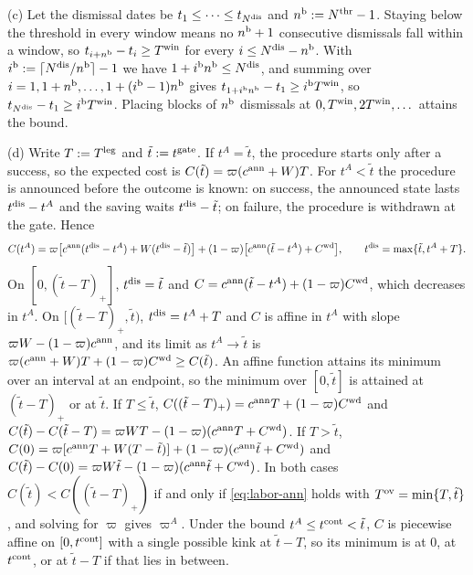 (c) Let the dismissal dates be $t_1\le\dots\le t_{N^{\rm dis}}$ and $n^{\rm b}:=N^{\rm thr}-1$. Staying below the threshold in every window means no $n^{\rm b}+1$ consecutive dismissals fall within a window, so $t_{i+n^{\rm b}}-t_i\ge T^{\rm win}$ for every $i\le N^{\rm dis}-n^{\rm b}$. With $i^{\rm b}:=\lceil N^{\rm dis}/n^{\rm b}\rceil-1$ we have $1+i^{\rm b}n^{\rm b}\le N^{\rm dis}$, and summing over $i=1,1+n^{\rm b},\dots,1+(i^{\rm b}-1)n^{\rm b}$ gives $t_{1+i^{\rm b}n^{\rm b}}-t_1\ge i^{\rm b}T^{\rm win}$, so $t_{N^{\rm dis}}-t_1\ge i^{\rm b}T^{\rm win}$. Placing blocks of $n^{\rm b}$ dismissals at $0,T^{\rm win},2T^{\rm win},\dots$ attains the bound.

(d) Write $T:=T^{\rm leg}$ and $\tilde t:=t^{\rm gate}$. If $t^A=\tilde t$, the procedure starts only after a success, so the expected cost is $C(\tilde t)=\varpi(c^{\rm ann}+W)T$. For $t^A<\tilde t$ the procedure is announced before the outcome is known: on success, the announced state lasts $t^{\rm dis}-t^A$ and the saving waits $t^{\rm dis}-\tilde t$; on failure, the procedure is withdrawn at the gate. Hence
\[
C(t^A)=\varpi\bigl[c^{\rm ann}(t^{\rm dis}-t^A)+W(t^{\rm dis}-\tilde t)\bigr]+(1-\varpi)\bigl[c^{\rm ann}(\tilde t-t^A)+C^{\rm wd}\bigr],\qquad t^{\rm dis}=\max\{\tilde t,t^A+T\}.
\]
On $[0,(\tilde t-T)_+]$, $t^{\rm dis}=\tilde t$ and $C=c^{\rm ann}(\tilde t-t^A)+(1-\varpi)C^{\rm wd}$, which decreases in $t^A$. On $[(\tilde t-T)_+,\tilde t)$, $t^{\rm dis}=t^A+T$ and $C$ is affine in $t^A$ with slope $\varpi W-(1-\varpi)c^{\rm ann}$, and its limit as $t^A\to\tilde t$ is $\varpi(c^{\rm ann}+W)T+(1-\varpi)C^{\rm wd}\ge C(\tilde t)$. An affine function attains its minimum over an interval at an endpoint, so the minimum over $[0,\tilde t]$ is attained at $(\tilde t-T)_+$ or at $\tilde t$. If $T\le\tilde t$, $C((\tilde t-T)_+)=c^{\rm ann}T+(1-\varpi)C^{\rm wd}$ and $C(\tilde t)-C(\tilde t-T)=\varpi WT-(1-\varpi)(c^{\rm ann}T+C^{\rm wd})$. If $T>\tilde t$, $C(0)=\varpi[c^{\rm ann}T+W(T-\tilde t)]+(1-\varpi)(c^{\rm ann}\tilde t+C^{\rm wd})$ and $C(\tilde t)-C(0)=\varpi W\tilde t-(1-\varpi)(c^{\rm ann}\tilde t+C^{\rm wd})$. In both cases $C(\tilde t)<C((\tilde t-T)_+)$ if and only if \eqref{eq:labor-ann} holds with $T^{\rm ov}=\min\{T,\tilde t\}$, and solving for $\varpi$ gives $\varpi^A$. Under the bound $t^A\le t^{\rm cont}<\tilde t$, $C$ is piecewise affine on $[0,t^{\rm cont}]$ with a single possible kink at $\tilde t-T$, so its minimum is at $0$, at $t^{\rm cont}$, or at $\tilde t-T$ if that lies in between.

